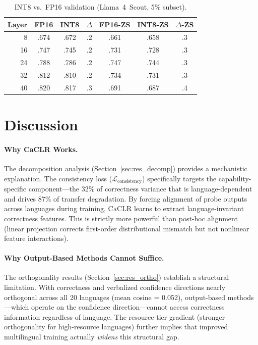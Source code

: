\documentclass[11pt,a4paper]{article}
\newcommand{\caclr}{\textsc{CaCLR}}
\begin{document}
\begin{table}[t]
\centering
\small
\caption{INT8 vs.\ FP16 validation (Llama~4~Scout, 5\% subset).}
\label{tab:int8}
\begin{tabular}{rcccccc}
\toprule
Layer & FP16 & INT8 & $\Delta$ & FP16-ZS & INT8-ZS & $\Delta$-ZS \\
\midrule
8 & .674 & .672 & .2 & .661 & .658 & .3 \\
16 & .747 & .745 & .2 & .731 & .728 & .3 \\
24 & .788 & .786 & .2 & .747 & .744 & .3 \\
32 & .812 & .810 & .2 & .734 & .731 & .3 \\
40 & .820 & .817 & .3 & .691 & .687 & .4 \\
\bottomrule
\end{tabular}
\end{table}

\section{Discussion}
\label{sec:discussion}

\paragraph{Why CaCLR Works.}
The decomposition analysis (Section~\ref{sec:res_decomp}) provides a mechanistic explanation. The consistency loss ($\mathcal{L}_\text{consistency}$) specifically targets the capability-specific component---the 32\% of correctness variance that is language-dependent and drives 87\% of transfer degradation. By forcing alignment of probe outputs across languages during training, \caclr{} learns to extract language-invariant correctness features. This is strictly more powerful than post-hoc alignment (linear projection corrects first-order distributional mismatch but not nonlinear feature interactions).

\paragraph{Why Output-Based Methods Cannot Suffice.}
The orthogonality results (Section~\ref{sec:res_ortho}) establish a structural limitation. With correctness and verbalized confidence directions nearly orthogonal across all 20 languages (mean cosine = 0.052), output-based methods---which operate on the confidence direction---cannot access correctness information regardless of language. The resource-tier gradient (stronger orthogonality for high-resource languages) further implies that improved multilingual training actually \emph{widens} this structural gap.
\end{document}
